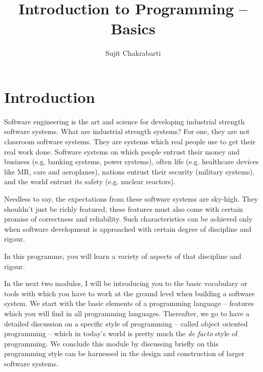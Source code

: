 \documentclass[12pt,a4paper]{article}
\author{Sujit Chakrabarti}
\title{Introduction to Programming -- Basics}
\date{}
\begin{document}

\newcommand{\highlight}[1]{{\color{Red}(#1)}}
\newcommand{\comment}[1]{{\color{Blue}#1}}


\maketitle

\section{Introduction}
Software engineering is the art and science for developing industrial strength software systems. What are industrial strength systems? For one, they are not classroom software systems. They are systems which real people use to get their real work done. Software systems on which people entrust their money and business (e.g. banking systems, power systems), often life (e.g. healthcare devices like MR, cars and aeroplanes), nations entrust their security (military systems), and the world entrust its safety (e.g. nuclear reactors).

Needless to say, the expectations from these software systems are sky-high. They shouldn't just be richly featured, these features must also come with certain promise of correctness and reliability. Such characteristics can be achieved only when software development is approached with certain degree of discipline and rigour.

In this programme, you will learn a variety of aspects of that discipline and rigour. 

In the next two modules, I will be introducing you to the basic vocabulary or tools with which you have to work at the ground level when building a software system. We start with the basic elements of a programming language -- features which you will find in all programming languages. Thereafter, we go to have a detailed discussion on a specific style of programming -- called object oriented programming -- which in today's world is pretty much the \emph{de facto} style of programming. We conclude this module by discussing briefly on this programming style can be harnessed in the design and construction of larger software systems.
\end{document}
